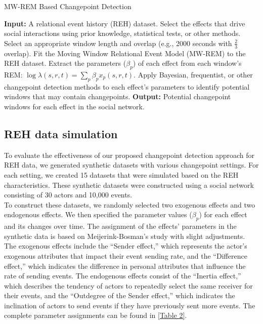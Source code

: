 \documentclass[]{interact}
\theoremstyle{plain}%
\theoremstyle{definition}
\theoremstyle{remark}
\begin{document}
{	\begin{algorithm}[H]
		\caption{MW-REM Based Changepoint Detection}\label{Algorithm1}
		\begin{algorithmic}[1]
			\State \textbf{Input:} A relational event history (REH) dataset.
			\State Select the effects that drive social interactions using prior knowledge, statistical tests, or other methods.
			\State Select an appropriate window length and overlap (e.g., 2000 seconds with $\frac{2}{3}$ overlap).
			\State Fit the Moving Window Relational Event Model (MW-REM) to the REH dataset.
			\State Extract the parameters ($\beta_p$) of each effect from each window's REM: $\log \lambda(s,r,t) = \sum_{p} \beta_p x_p(s,r,t)$.
			\State Apply Bayesian, frequentist, or other changepoint detection methods to each effect's parameters to identify potential windows that may contain changepoints.
			\State \textbf{Output:} Potential changepoint windows for each effect in the social network.
		\end{algorithmic}
	\end{algorithm}

	\subsection{REH data simulation} \label{sec:simulation}
	
	\hspace{0.2cm} To evaluate the effectiveness of our proposed changepoint detection approach for REH data, we generated synthetic datasets with various changepoint settings. For each setting, we created 15 datasets that were simulated based on the REH characteristics. These synthetic datasets were constructed using a social network consisting of 30 actors and 10,000 events.\\
	
	To construct these datasets, we randomly selected two exogenous effects and two endogenous effects. We then specified the parameter values ($\beta_p$) for each effect and its changes over time. The assignment of the effects' parameters in the synthetic data is based on Meijerink-Bosman's study\cite{meijerink-bosmanDiscoveringTrendsSocial2022} with slight adjustments. The exogenous effects include the ``Sender effect,'' which represents the actor's exogenous attributes that impact their event sending rate, and the ``Difference effect,'' which indicates the difference in personal attributes that influence the rate of sending events. The endogenous effects consist of the ``Inertia effect,'' which describes the tendency of actors to repeatedly select the same receiver for their events, and the ``Outdegree of the Sender effect,'' which indicates the inclination of actors to send events if they have previously sent more events. 
	The complete parameter assignments can be found in \autoref{Table 2}. \\
	
}
\end{document}
